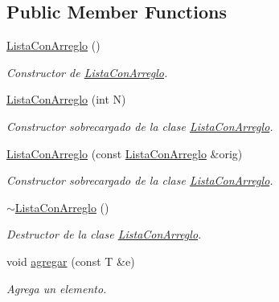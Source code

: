 \subsection*{Public Member Functions}
\begin{DoxyCompactItemize}
\item 
\hypertarget{class_lista_con_arreglo_aeaef142f90f5bea1ecd4121d545f9c73}{}\label{class_lista_con_arreglo_aeaef142f90f5bea1ecd4121d545f9c73} 
\hyperlink{class_lista_con_arreglo_aeaef142f90f5bea1ecd4121d545f9c73}{Lista\+Con\+Arreglo} ()
\begin{DoxyCompactList}\small\item\em Constructor de \hyperlink{class_lista_con_arreglo}{Lista\+Con\+Arreglo}. \end{DoxyCompactList}\item 
\hyperlink{class_lista_con_arreglo_a9541812a0019b76c6529184356913a59}{Lista\+Con\+Arreglo} (int N)
\begin{DoxyCompactList}\small\item\em Constructor sobrecargado de la clase \hyperlink{class_lista_con_arreglo}{Lista\+Con\+Arreglo}. \end{DoxyCompactList}\item 
\hyperlink{class_lista_con_arreglo_ab7a22a8f04de9403d32a7431d4dd9627}{Lista\+Con\+Arreglo} (const \hyperlink{class_lista_con_arreglo}{Lista\+Con\+Arreglo} \&orig)
\begin{DoxyCompactList}\small\item\em Constructor sobrecargado de la clase \hyperlink{class_lista_con_arreglo}{Lista\+Con\+Arreglo}. \end{DoxyCompactList}\item 
\hypertarget{class_lista_con_arreglo_a79115cdeaa5ff1f6e3817b3c201f88a3}{}\label{class_lista_con_arreglo_a79115cdeaa5ff1f6e3817b3c201f88a3} 
\hyperlink{class_lista_con_arreglo_a79115cdeaa5ff1f6e3817b3c201f88a3}{$\sim$\+Lista\+Con\+Arreglo} ()
\begin{DoxyCompactList}\small\item\em Destructor de la clase \hyperlink{class_lista_con_arreglo}{Lista\+Con\+Arreglo}. \end{DoxyCompactList}\item 
void \hyperlink{class_lista_con_arreglo_a0164c47d0fb79d355a30f9b7acd8c762}{agregar} (const T \&e)
\begin{DoxyCompactList}\small\item\em Agrega un elemento. \end{DoxyCompactList}\item 

\end{DoxyCompactItemize}
